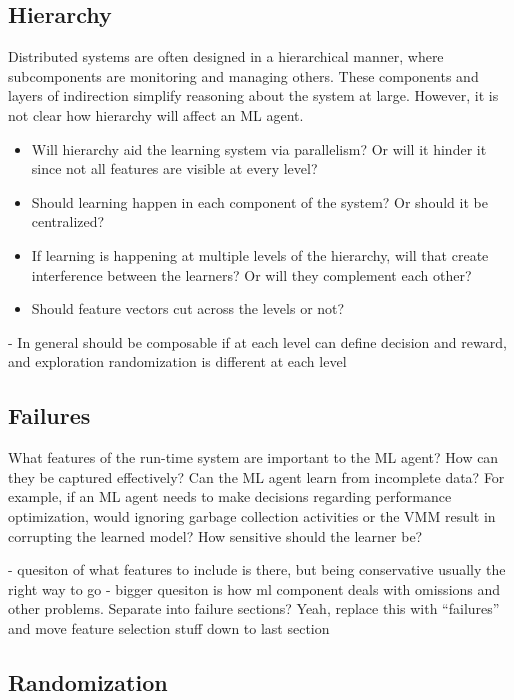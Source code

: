 \documentclass[a4paper,twocolumn]{article}
\begin{document}
\subsection*{Hierarchy}
Distributed systems are often designed in a hierarchical manner, where
subcomponents are monitoring and managing others. These components and layers of
indirection simplify reasoning about the system at large. However, it is not
clear how hierarchy will affect an ML agent.
\begin{itemize}
  \item Will hierarchy aid the learning system via parallelism? Or will it hinder
    it since not all features are visible at every level?
  \item Should learning happen in each component of the system? Or should it be
    centralized?
  \item If learning is happening at multiple levels of the hierarchy, will that
    create interference between the learners? Or will they complement each
    other?
   \item Should feature vectors cut across the levels or not?
\end{itemize}

- In general should be composable if at each level can define decision and reward,
and exploration randomization is different at each level

\subsection*{Failures}

What features of the run-time system are important to the ML agent? How can they
be captured effectively? Can the ML agent learn from incomplete data? For
example, if an ML agent needs to make decisions regarding performance
optimization, would ignoring garbage collection activities or the VMM result in
corrupting the learned model? How sensitive should the learner be?

- quesiton of what features to include is there, but being conservative usually the right
way to go
- bigger quesiton is how ml component deals with omissions and other problems. Separate
into failure sections? Yeah, replace this with ``failures'' and move feature selection stuff
down to last section

\subsection*{Randomization}
\end{document}
